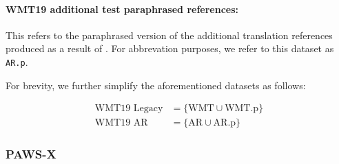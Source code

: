 \documentclass[11pt,a4paper]{article}
\begin{document}
\paragraph{WMT19 additional test paraphrased references:}This refers to the paraphrased version of the additional translation references produced as a result of \citet{freitag-bleu-paraphrase-references-2020}. For abbrevation purposes, we refer to this dataset as \texttt{AR.p}.

For brevity, we further simplify the aforementioned datasets as follows:

\vspace{-10pt}
\begin{align}
  \text{WMT19 Legacy} &= \{\text{WMT} \cup \text{WMT.p} \} \\
  \text{WMT19 AR} &= \{\text{AR} \cup \text{AR.p} \}
\end{align}

\subsubsection{PAWS-X}



\end{document}

